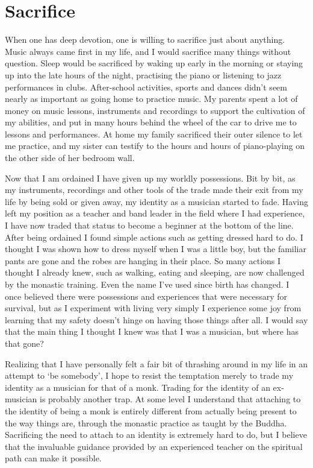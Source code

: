 \section{Sacrifice}

When one has deep devotion, one is willing to sacrifice just about
anything. Music always came first in my life, and I would sacrifice many
things without question. Sleep would be sacrificed by waking up early in
the morning or staying up into the late hours of the night, practising
the piano or listening to jazz performances in clubs. After-school
activities, sports and dances didn't seem nearly as important as going
home to practice music. My parents spent a lot of money on music
lessons, instruments and recordings to support the cultivation of my
abilities, and put in many hours behind the wheel of the car to drive me
to lessons and performances. At home my family sacrificed their outer
silence to let me practice, and my sister can testify to the hours and
hours of piano-playing on the other side of her bedroom wall. 

Now that I am ordained I have given up my worldly possessions. Bit by
bit, as my instruments, recordings and other tools of the trade made
their exit from my life by being sold or given away, my identity as a
musician started to fade. Having left my position as a teacher and
band leader in the field where I had experience, I have now traded that
status to become a beginner at the bottom of the line. After being
ordained I found simple actions such as getting dressed hard to do. I
thought I was shown how to dress myself when I was a little boy, but the
familiar pants are gone and the robes are hanging in their place. So
many actions I thought I already knew, such as walking, eating and
sleeping, are now challenged by the monastic training. Even the name
I've used since birth has changed. I once believed there were
possessions and experiences that were necessary for survival, but as I
experiment with living very simply I experience some joy from learning
that my safety doesn't hinge on having those things after all. I would
say that the main thing I thought I knew was that I was a musician, but
where has that gone? 

Realizing that I have personally felt a fair bit of thrashing around in
my life in an attempt to `be somebody', I hope to resist the temptation
merely to trade my identity as a musician for that of a monk. Trading
for the identity of an ex-musician is probably another trap. At some
level I understand that attaching to the identity of being a monk is
entirely different from actually being present to the way things are, 
through the monastic practice as taught by the Buddha. Sacrificing the
need to attach to an identity is extremely hard to do, but I believe
that the invaluable guidance provided by an experienced teacher on the
spiritual path can make it possible. 

